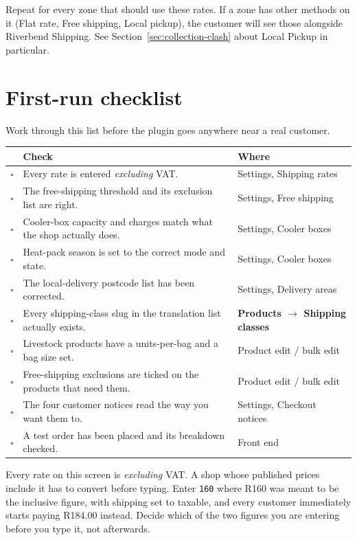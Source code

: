 \documentclass[11pt,a4paper,oneside]{report}
\newcommand{\opt}[1]{\texttt{\small #1}}
\newcommand{\menu}[1]{\textsf{\textbf{#1}}}
\newcommand{\R}[1]{R#1}
\begin{document}
Repeat for every zone that should use these rates. If a zone has other methods on it
(Flat rate, Free shipping, Local pickup), the customer will see those alongside
Riverbend Shipping. See Section~\ref{sec:collection-clash} about Local Pickup in
particular.

\section{First-run checklist}

Work through this list before the plugin goes anywhere near a real customer.

\begin{longtable}{@{}p{0.6cm}L{9.6cm}L{4.4cm}@{}}
\toprule
& \textbf{Check} & \textbf{Where}\\
\midrule
\endhead
$\square$ & Every rate is entered \emph{excluding} VAT. & Settings, Shipping rates\\
$\square$ & The free-shipping threshold and its exclusion list are right. & Settings, Free shipping\\
$\square$ & Cooler-box capacity and charges match what the shop actually does. & Settings, Cooler boxes\\
$\square$ & Heat-pack season is set to the correct mode and state. & Settings, Cooler boxes\\
$\square$ & The local-delivery postcode list has been corrected. & Settings, Delivery areas\\
$\square$ & Every shipping-class slug in the translation list actually exists. & \menu{Products $\rightarrow$ Shipping classes}\\
$\square$ & Livestock products have a units-per-bag and a bag size set. & Product edit / bulk edit\\
$\square$ & Free-shipping exclusions are ticked on the products that need them. & Product edit / bulk edit\\
$\square$ & The four customer notices read the way you want them to. & Settings, Checkout notices\\
$\square$ & A test order has been placed and its breakdown checked. & Front end\\
\bottomrule
\end{longtable}

\begin{housewarn}
Every rate on this screen is \emph{excluding} VAT. A shop whose published prices
include it has to convert before typing. Enter \opt{160} where \R{160} was meant to
be the inclusive figure, with shipping set to taxable, and every customer immediately
starts paying \R{184.00} instead. Decide which of the two figures you are entering
before you type it, not afterwards.
\end{housewarn}
\end{document}
